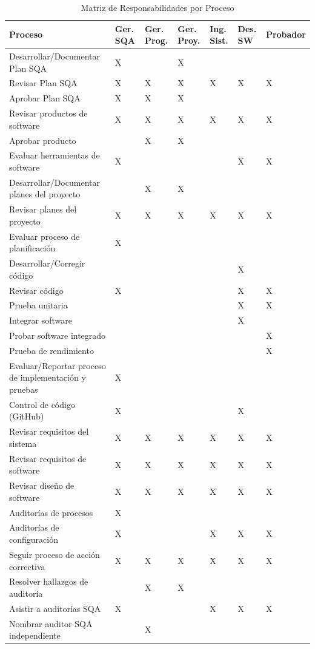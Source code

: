 \begin{table}[H]
\centering
\caption{Matriz de Responsabilidades por Proceso}
\label{tab:responsibility}
\begin{tabular}{|p{5cm}|p{1.5cm}|p{1.5cm}|p{1.5cm}|p{1.3cm}|p{1.3cm}|p{1.5cm}|}
\hline
\textbf{Proceso} & \textbf{Ger. SQA} & \textbf{Ger. Prog.} & \textbf{Ger. Proy.} & \textbf{Ing. Sist.} & \textbf{Des. SW} & \textbf{Probador} \\
\hline
Desarrollar/Documentar Plan SQA & X & & X & & & \\
\hline
Revisar Plan SQA & X & X & X & X & X & X \\
\hline
Aprobar Plan SQA & X & X & X & & & \\
\hline
Revisar productos de software & X & X & X & X & X & X \\
\hline
Aprobar producto & & X & X & & & \\
\hline
Evaluar herramientas de software & X & & & & X & X \\
\hline
Desarrollar/Documentar planes del proyecto & & X & X & & & \\
\hline
Revisar planes del proyecto & X & X & X & X & X & X \\
\hline
Evaluar proceso de planificación & X & & & & & \\
\hline
Desarrollar/Corregir código & & & & & X & \\
\hline
Revisar código & X & & & & X & X \\
\hline
Prueba unitaria & & & & & X & X \\
\hline
Integrar software & & & & & X & \\
\hline
Probar software integrado & & & & & & X \\
\hline
Prueba de rendimiento & & & & & & X \\
\hline
Evaluar/Reportar proceso de implementación y pruebas & X & & & & & \\
\hline
Control de código (GitHub) & X & & & & X & \\
\hline
Revisar requisitos del sistema & X & X & X & X & X & X \\
\hline
Revisar requisitos de software & X & X & X & X & X & X \\
\hline
Revisar diseño de software & X & X & X & X & X & X \\
\hline
Auditorías de procesos & X & & & & & \\
\hline
Auditorías de configuración & X & & & X & X & X \\
\hline
Seguir proceso de acción correctiva & X & X & X & X & X & X \\
\hline
Resolver hallazgos de auditoría & & X & X & & & \\
\hline
Asistir a auditorías SQA & X & & & X & X & X \\
\hline
Nombrar auditor SQA independiente & & X & & & & \\
\hline
\end{tabular}
\end{table}

